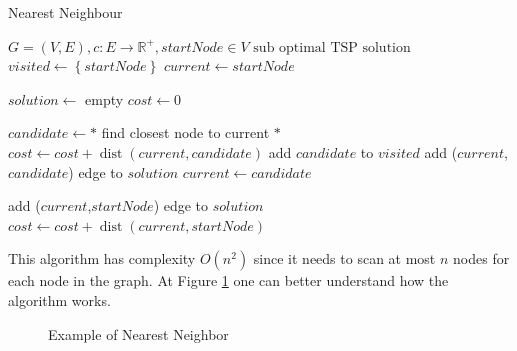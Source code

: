 \begin{algorithm}
    \caption{Nearest Neighbour}\label{algo:greedy}
    \begin{algorithmic}[1]
    \Require $G = (V,E), c:E \to \mathbb{R}^+, startNode \in V$
    \Ensure $\text{sub optimal TSP solution}$
    \State $visited \gets \left \{ startNode \right \}$
    \State $current \gets startNode$




    \State $solution \gets$ empty
    \State $cost \gets 0$




    \State $candidate \gets *$ find closest node to current $*$
    \State $cost \gets cost + \operatorname{dist}(current, candidate)$
    \State add $candidate$ to $visited$
    \State add ($current$,$candidate$) edge to $solution$
    \State $current \gets candidate$
    \EndWhile




    \State add ($current$,$startNode$) edge to $solution$
    \State $cost \gets cost + \operatorname{dist}(current, startNode)$


    \end{algorithmic}
\end{algorithm}

This algorithm has complexity $O(n^2)$ since it needs to scan at most $n$ nodes for each node in the graph. At Figure \ref{fig:greedy} one can better understand how the algorithm works.

\begin{figure}[!h]
    \centering
    \caption{Example of Nearest Neighbor} \label{fig:greedy}
\end{figure}

